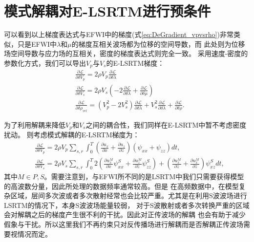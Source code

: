 \section{模式解耦对E-LSRTM进行预条件}
可以看到以上梯度表达式与EFWI中的梯度(式\ref{eq:DeGradient_vpvsrho})非常类似，只是EFWI中$\lambda$和$\mu$的梯度互相关波场都为位移的空间导数，而
此处则为位移场空间导数与应力场的互相关，密度的梯度表达式则完全一致。
采用速度-密度的参数化方式，我们可以导出$V_p$与$V_s$的E-LSRTM梯度：
\begin{equation}
\begin{split}
   & \frac{\partial\mathcal{L}}{\partial \delta V_p}=2\rho V_p\frac{\partial\mathcal{L}}{\partial \delta \lambda}\\
   & \frac{\partial\mathcal{L}}{\partial \delta V_s}=2\rho V_s(-2\frac{\partial\mathcal{L}}{\partial \delta \lambda}
	+\frac{\partial\mathcal{L}}{\partial \delta \mu})\\
   & \frac{\partial\mathcal{L}}{\partial \delta\rho_{vel}}=(V^2_p-2V^2_s)\frac{\partial\mathcal{L}}{\partial \delta \lambda}+V^2_s\frac{\partial\mathcal{L}}{\partial \delta \lambda}+\frac{\partial\mathcal{L}}{\partial \delta\rho}.
    \label{eq:Gradient_VpVsrho_LSRTM}
\end{split}
\end{equation}

为了利用解耦来降低$V_p$和$V_s$之间的耦合性，我们同样在E-LSRTM中暂不考虑密度扰动。
则考虑模式解耦的E-LSRTM梯度为：
\begin{equation}
\begin{split}
   & \frac{\partial\mathcal{L}}{\partial \delta V_p}=2\rho V_p\sum_{s,r}\int^T_{0}
	(\frac{\partial u_x}{\partial x}+\frac{\partial u_z}{\partial
	z})(\psi_{xx}+\psi_{zz})dt,\\
   & \frac{\partial\mathcal{L}}{\partial \delta V_s}=2\rho V_s\sum_{s,r}\int^T_{0}
	2(\frac{\partial u^M_x}{\partial x}\psi^S_{xx}+\frac{\partial u^M_z}{\partial z}\psi^S_{zz})+
	(\frac{\partial u^M_x}{\partial z}+\frac{\partial u^M_x}{\partial
	z})\psi^S_{xz}dt,
    \label{eq:Gradient_lambdamurho_LSRTM}
\end{split}
\end{equation}
其中$M\in{P,S}$。需要注意到，与EFWI所不同的是LSRTM中我们只需要获得模型的高波数分量，因此所处理的数据频率通常较高。但是
在高频数据中，在模型复杂区域，层间多次波或者多次散射经常也会比较严重。尤其是在利用S波波场进行LSRTM的情况下，本身S波波场能量较弱，
对于S波散射或者多次转换严重的区域会对解耦之后的梯度产生很不利的干扰。因此对正传波场的解耦
也会有助于减少假象与干扰。所以这里我们不再约束只对反传播场进行解耦而是否解耦正传波场需要视情况而定。

